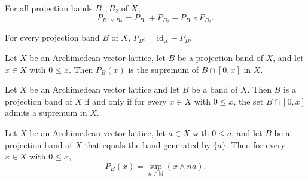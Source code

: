 \begin{lemma}
\label{lem:projectionBand-bandProjection-sup}
\leanok
{}
For all projection bands $B_1, B_2$ of $X$,
\[
  P_{B_1 \vee B_2} = P_{B_1} + P_{B_2} - P_{B_1} \circ P_{B_2}.
\]
\end{lemma}

\begin{lemma}
\label{lem:projectionBand-bandProjection-compl}
\leanok
{}
For every projection band $B$ of $X$,
$P_{B^c} = \mathrm{id}_X - P_B$.
\end{lemma}

\begin{theorem}
\label{thm:projectionBand-isLUB-inter-Icc-bandProjection}
\leanok
{}
Let $X$ be an Archimedean vector lattice, let $B$ be a projection
band of $X$, and let $x \in X$ with $0 \le x$. Then $P_B(x)$ is the
supremum of $B \cap [0, x]$ in $X$.
\end{theorem}

\begin{theorem}
\label{thm:projectionBand-projectionBand-iff-isLUB-inter-Icc}
\leanok
{}
Let $X$ be an Archimedean vector lattice and let $B$ be a band of
$X$. Then $B$ is a projection band of $X$ if and only if for every
$x \in X$ with $0 \le x$, the set $B \cap [0, x]$ admits a supremum
in $X$.
\end{theorem}

\begin{theorem}
\label{thm:projectionBand-isLUB-range-bandProjection-of-principalBand}
\leanok
{}
Let $X$ be an Archimedean vector lattice, let $a \in X$ with
$0 \le a$, and let $B$ be a projection band of $X$ that equals the
band generated by $\{a\}$. Then for every $x \in X$ with $0 \le x$,
\[
  P_B(x) = \sup_{n \in \mathbb{N}} (x \wedge n a).
\]
\end{theorem}


